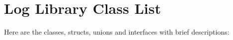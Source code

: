 \section{Log Library Class List}
Here are the classes, structs, unions and interfaces with brief descriptions:\begin{CompactList}
\item{}
\end{CompactList}
